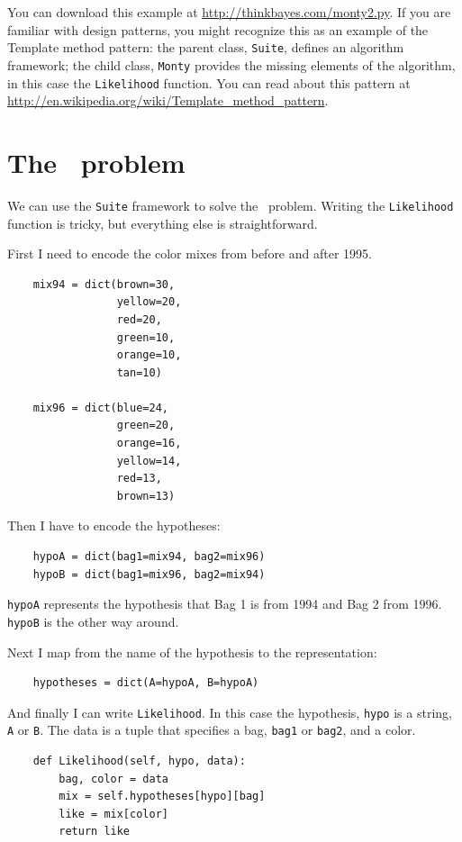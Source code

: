 \documentclass[12pt]{book}
\begin{document}
You can download this example at
\url{http://thinkbayes.com/monty2.py}.  If you are familiar with
design patterns, you might recognize this as an example of the
Template method pattern: the parent class, \verb"Suite", defines an
algorithm framework; the child class, \verb"Monty" provides the
missing elements of the algorithm, in this case the \verb"Likelihood"
function.  You can read about this pattern at
\url{http://en.wikipedia.org/wiki/Template_method_pattern}.


\section{The \MM~problem}

We can use the \verb"Suite" framework to solve the \MM~problem.
Writing the \verb"Likelihood" function is tricky, but everything
else is straightforward.

First I need to encode the color mixes from before and
after 1995.

\begin{verbatim}
    mix94 = dict(brown=30,
                 yellow=20,
                 red=20,
                 green=10,
                 orange=10,
                 tan=10)

    mix96 = dict(blue=24,
                 green=20,
                 orange=16,
                 yellow=14,
                 red=13,
                 brown=13)
\end{verbatim}

Then I have to encode the hypotheses:

\begin{verbatim}
    hypoA = dict(bag1=mix94, bag2=mix96)
    hypoB = dict(bag1=mix96, bag2=mix94)
\end{verbatim}

\verb"hypoA" represents the hypothesis that Bag 1 is from
1994 and Bag 2 from 1996.  \verb"hypoB" is the other way
around.

Next I map from the name of the hypothesis to the representation:

\begin{verbatim}
    hypotheses = dict(A=hypoA, B=hypoA)
\end{verbatim}

And finally I can write \verb"Likelihood".  In this case
the hypothesis, \verb"hypo" is a string, \verb"A" or \verb"B".
The data is a tuple that specifies a bag, \verb"bag1" or \verb"bag2",
and a color.

\begin{verbatim}
    def Likelihood(self, hypo, data):
        bag, color = data
        mix = self.hypotheses[hypo][bag]
        like = mix[color]
        return like
\end{verbatim}
\end{document}
